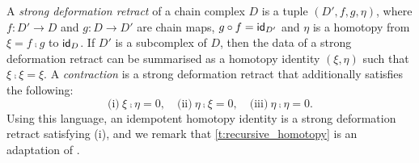 \begin{remark*}
	A \emph{strong deformation retract} \cite{Lambe-Stasheff} of a chain complex $D$ is a tuple $(D',f,g,\eta)$, where $f\colon D' \to D$ and $g\colon D\to D'$ are chain maps, $g \mathbin{\circ} f = \mathsf{id}_{D'}$ and $\eta$ is a homotopy from $\xi=f \comp g$ to $\mathsf{id}_D$. If $D'$ is a subcomplex of $D$, then the data of a strong deformation retract can be summarised as a homotopy identity $(\xi,\eta)$ such that $\xi\comp\xi = \xi$. A \emph{contraction} \cite{EML,gonzalez2003computation} is a strong deformation retract that additionally satisfies the following:
	\[
	\text{(i)}\ \xi \comp \eta = 0, \quad
	\text{(ii)}\ \eta \comp \xi = 0, \quad
	\text{(iii)}\ \eta \comp \eta = 0.
	\]
	Using this language, an idempotent homotopy identity is a strong deformation retract satisfying (i), and we remark that \cref{t:recursive_homotopy} is an adaptation of \cite[p.367]{Lambe-Stasheff}.
\end{remark*}
